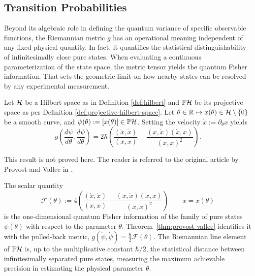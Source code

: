 \subsection*{Transition Probabilities}
 Beyond its algebraic role in defining the quantum variance of specific observable functions, the Riemannian metric $g$ has an operational meaning independent of any fixed physical quantity. In fact, it quantifies the  statistical distinguishability of infinitesimally close pure states. When evaluating a continuous parameterization of the state space, the metric tensor yields the quantum Fisher information. That sets the geometric limit on how nearby states can be resolved by any experimental measurement.

\begin{theorem}
	\label{thm:provost-vallee}
	Let $\H$ be a Hilbert space as in Definition \ref{def:hilbert} and $\PH$ be its projective space as per Definition \ref{def:projective-hilbert-space}. Let $\theta \in \R \mapsto x(\theta)\in\H\setminus\{0\}$ be a smooth curve, and $\psi(\theta):=[x(\theta)]\in\PH$. Setting the velocity $\dot x:=\partial_\theta x$ yields
	\begin{equation}
		g\left(\frac{d\psi}{d\theta},\frac{d\psi}{d\theta}\right)
		= 2\hbar\left(\frac{(\dot x,\dot x)}{(x,x)}-\frac{(x,\dot x)(\dot x,x)}{(x,x)^2}\right).
	\end{equation}
\end{theorem}
\noindent This result is not proved here. The reader is referred to the original article by Provost and Vallee in \cite[Section 2]{provostRiemannianStructureManifolds1980}.

\begin{remark}
	The scalar quantity
	\begin{equation}
		\mathcal F(\theta):=4\left(\frac{(\dot x,\dot x)}{(x,x)}-\frac{(x,\dot x)(\dot x,x)}{(x,x)^2}\right) \qquad x = x(\theta)
	\end{equation}
	is the one-dimensional quantum Fisher information of the family of pure states $\psi(\theta)$ with respect to the parameter $\theta$. Theorem~\ref{thm:provost-vallee} identifies it with the pulled-back metric, $g(\dot\psi,\dot\psi) = \frac\hbar2\mathcal F(\theta)$. The Riemannian line element of $\PH$ is, up to the multiplicative constant $\hbar/2$, the statistical distance between infinitesimally separated pure states, measuring the maximum achievable precision in estimating the physical parameter $\theta$.
\end{remark}

